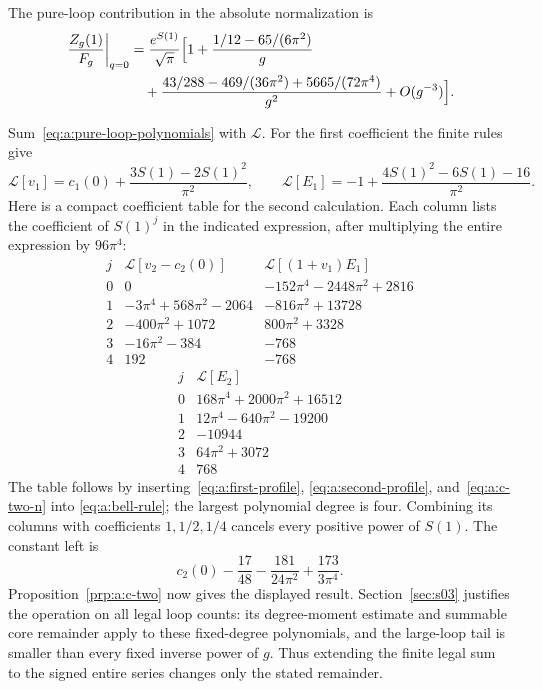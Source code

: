 \begin{prp}\label{prp:a:pure-loops}
The pure-loop contribution in the absolute normalization is
\begin{equation}\label{eq:a:q-zero}
\begin{aligned}
 \left.\frac{Z_g(1)}{F_g}\right|_{q=0}
 &=\frac{e^{S(1)}}{\sqrt\pi}\Bigl[1
   +\frac{1/12-65/(6\pi^2)}g\\
 &\quad+\frac{43/288-469/(36\pi^2)+5665/(72\pi^4)}{g^2}
   +O(g^{-3})\Bigr].
\end{aligned}
\end{equation}
\end{prp}
\begin{prf}
Sum~\eqref{eq:a:pure-loop-polynomials} with $\mathcal L$.
For the first coefficient the finite rules give
\[
 \mathcal L[v_1]=c_1(0)+\frac{3S(1)-2S(1)^2}{\pi^2},\qquad
 \mathcal L[E_1]=-1+\frac{4S(1)^2-6S(1)-16}{\pi^2}.
\]
Here is a compact coefficient table for the second calculation. Each
column lists the coefficient of $S(1)^j$ in the indicated expression,
after multiplying the entire expression by $96\pi^4$:
\[
\begin{array}{c|r|r}
 j&\mathcal L[v_2-c_2(0)]&\mathcal L[(1+v_1)E_1]\\\hline
0&0&-152\pi^4-2448\pi^2+2816\\
1&-3\pi^4+568\pi^2-2064&-816\pi^2+13728\\
2&-400\pi^2+1072&800\pi^2+3328\\
3&-16\pi^2-384&-768\\
4&192&-768
\end{array}
\]
\[
\begin{array}{c|r}
 j&\mathcal L[E_2]\\\hline
0&168\pi^4+2000\pi^2+16512\\
1&12\pi^4-640\pi^2-19200\\
2&-10944\\
3&64\pi^2+3072\\
4&768
\end{array}
\]
The table follows by inserting~\eqref{eq:a:first-profile},
\eqref{eq:a:second-profile}, and~\eqref{eq:a:c-two-n} into
\eqref{eq:a:bell-rule}; the largest polynomial degree is four.
Combining its columns with coefficients $1,1/2,1/4$ cancels every
positive power of $S(1)$. The constant left is
\[
 c_2(0)-\frac{17}{48}-\frac{181}{24\pi^2}
                                      +\frac{173}{3\pi^4}.
\]
Proposition~\ref{prp:a:c-two} now gives the displayed result.
Section~\ref{sec:s03} justifies the operation on all legal loop
counts: its degree-moment estimate and summable core remainder apply
to these fixed-degree polynomials, and the large-loop tail is smaller
than every fixed inverse power of $g$. Thus extending the finite legal
sum to the signed entire series changes only the stated remainder.
\end{prf}

